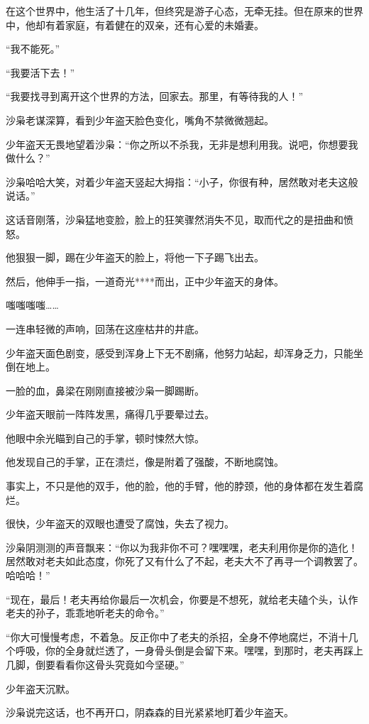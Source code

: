 \begin{this_body}
在这个世界中，他生活了十几年，但终究是游子心态，无牵无挂。但在原来的世界中，他却有着家庭，有着健在的双亲，还有心爱的未婚妻。

“我不能死。”

“我要活下去！”

“我要找寻到离开这个世界的方法，回家去。那里，有等待我的人！”

沙枭老谋深算，看到少年盗天脸色变化，嘴角不禁微微翘起。

少年盗天无畏地望着沙枭：“你之所以不杀我，无非是想利用我。说吧，你想要我做什么？”

沙枭哈哈大笑，对着少年盗天竖起大拇指：“小子，你很有种，居然敢对老夫这般说话。”

这话音刚落，沙枭猛地变脸，脸上的狂笑骤然消失不见，取而代之的是扭曲和愤怒。

他狠狠一脚，踢在少年盗天的脸上，将他一下子踢飞出去。

然后，他伸手一指，一道奇光****而出，正中少年盗天的身体。

嗤嗤嗤嗤……

一连串轻微的声响，回荡在这座枯井的井底。

少年盗天面色剧变，感受到浑身上下无不剧痛，他努力站起，却浑身乏力，只能坐倒在地上。

一脸的血，鼻梁在刚刚直接被沙枭一脚踢断。

少年盗天眼前一阵阵发黑，痛得几乎要晕过去。

他眼中余光瞄到自己的手掌，顿时悚然大惊。

他发现自己的手掌，正在溃烂，像是附着了强酸，不断地腐蚀。

事实上，不只是他的双手，他的脸，他的手臂，他的脖颈，他的身体都在发生着腐烂。

很快，少年盗天的双眼也遭受了腐蚀，失去了视力。

沙枭阴测测的声音飘来：“你以为我非你不可？嘿嘿嘿，老夫利用你是你的造化！居然敢对老夫如此态度，你死了又有什么了不起，老夫大不了再寻一个调教罢了。哈哈哈！”

“现在，最后！老夫再给你最后一次机会，你要是不想死，就给老夫磕个头，认作老夫的孙子，乖乖地听老夫的命令。”

“你大可慢慢考虑，不着急。反正你中了老夫的杀招，全身不停地腐烂，不消十几个呼吸，你的全身就烂透了，一身骨头倒是会留下来。嘿嘿，到那时，老夫再踩上几脚，倒要看看你这骨头究竟如今坚硬。”

少年盗天沉默。

沙枭说完这话，也不再开口，阴森森的目光紧紧地盯着少年盗天。


\end{this_body}
